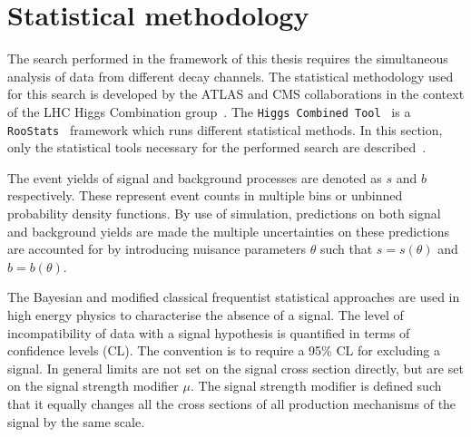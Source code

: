 \section{Statistical methodology}
\label{sec:Stat}
The search performed in the framework of this thesis requires the simultaneous analysis of data from different decay channels. The statistical methodology used for this search is developed by the ATLAS and CMS collaborations in the context of the LHC Higgs Combination group~\cite{Chatrchyan:2012tx,Cowan:2010js,CMS-PAS-HIG-12-020,CMS-NOTE-2011-005}. The \texttt{Higgs Combined Tool}~\cite{HiggsCombine} is a 
\texttt{RooStats}~\cite{Moneta:2010pm} framework which runs different statistical methods. In this section, only the statistical tools necessary for the performed search are described~\cite{CLs}.

The event yields of signal and background processes are denoted as $s$ and $b$ respectively. These represent event counts in multiple bins or unbinned probability density functions. By use of simulation, predictions on both signal and background yields are made the multiple uncertainties on these predictions are accounted for by introducing nuisance parameters $\theta$ such that $s = s(\theta)$ and $b=b(\theta)$.%

The Bayesian and modified classical frequentist statistical approaches are used in high energy physics to characterise the absence of a signal.  The level of incompatibility of data with a signal hypothesis is quantified in terms of confidence levels (CL). The convention is to require a 95\% CL for excluding a signal. In general limits are not set on the signal cross section directly, but are set on the signal strength modifier $\mu$. The signal strength modifier is defined such that it equally changes all the cross sections of all production mechanisms of the signal by the same scale.  



